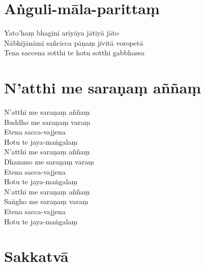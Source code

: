 \chapter{Aṅguli-māla-parittaṃ}%


\begin{paritta}
Yato'haṃ bhagini ariyāya jātiyā jāto\\
Nābhijānāmi sañcicca pāṇaṃ jīvitā voropetā\\
Tena saccena sotthi te hotu sotthi gabbhassa



\end{paritta}

\clearpage

\chapter{N'atthi me saraṇaṃ aññaṃ}%


\begin{paritta}
N'atthi me saraṇaṃ aññaṃ\\
Buddho me saraṇaṃ varaṃ\\
Etena sacca-vajjena\\
Hotu te jaya-maṅgalaṃ\\
N'atthi me saraṇaṃ aññaṃ\\
Dhammo me saraṇaṃ varaṃ\\
Etena sacca-vajjena\\
Hotu te jaya-maṅgalaṃ\\
N'atthi me saraṇaṃ aññaṃ\\
Saṅgho me saraṇaṃ varaṃ\\
Etena sacca-vajjena\\
Hotu te jaya-maṅgalaṃ
\end{paritta}

\chapter{Sakkatvā}%


